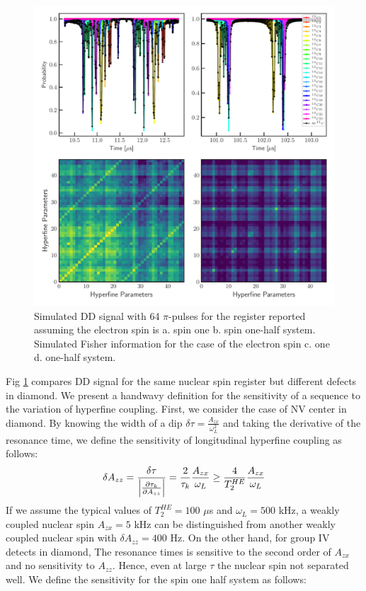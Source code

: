 \documentclass[%
 reprint,
superscriptaddress,
 amsmath,amssymb,
 aps,
]{revtex4-2}
\begin{document}
\begin{figure}%
	\begin{center}
		\includegraphics[width=0.9\columnwidth]{pict/dd_compare2.pdf}
		\caption{Simulated DD signal with 64 $\pi$-pulses for the register reported \cite{abobeih2019atomic} assuming the electron spin is a. spin one b. spin one-half system. Simulated Fisher information for the case of the electron spin c. one d. one-half system.}
		\label{fig:3}
	\end{center}
\end{figure}
Fig \ref{fig:3} compares DD signal for the same nuclear spin register but different defects in diamond. We present a handwavy definition for the sensitivity of a sequence to the variation of hyperfine coupling. First, we consider the case of NV center in diamond. By knowing the width of a dip $\delta \tau = \frac{A_{zx}}{\omega_L^2}$  and taking the derivative of the resonance time, we define the sensitivity of longitudinal hyperfine coupling as follows:
\begin{gather}
	\delta A_{zz} = \frac{\delta \tau}{\abs{\frac{\partial \tau_k}{\partial A_{zz}}}} = \frac{2}{\tau_k} \frac{A_{zx}}{\omega_L} \ge \frac{4}{T_2^{HE}} \frac{A_{zx}}{\omega_L}
\end{gather}
If we assume the typical values of $T_2^{HE} = 100 $ $\mu$s and $\omega_L=500 $ kHz, a weakly coupled nuclear spin $A_{zx}=5$ kHz can be distinguished from another weakly coupled nuclear spin with $\delta A_{zz} = 400$ Hz. On the other hand, for group IV detects in diamond, The resonance times is sensitive to the second order of $A_{zx}$ and no sensitivity to $A_{zz}$. Hence, even at large $\tau$ the nuclear spin not separated well. We define the sensitivity for the spin one half system as follows:
\end{document}
